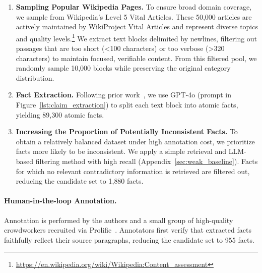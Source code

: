 \documentclass[11pt]{article}
\begin{document}
\begin{enumerate}
\item \textbf{Sampling Popular Wikipedia Pages.} To ensure broad domain coverage, we sample from Wikipedia's Level 5 Vital Articles. These 50{,}000 articles are actively maintained by WikiProject Vital Articles and represent diverse topics and quality levels.\footnote{\url{https://en.wikipedia.org/wiki/Wikipedia:Content_assessment}} We extract text blocks delimited by newlines, filtering out passages that are too short (<100 characters) or too verbose (>320 characters) to maintain focused, verifiable content. From this filtered pool, we randomly sample 10{,}000 blocks while preserving the original category distribution.

\item \textbf{Fact Extraction.} Following prior work~\citep{semnani-etal-2023-wikichat}, we use GPT-4o (prompt in Figure~\ref{lst:claim_extraction}) to split each text block into atomic facts, yielding 89{,}300 atomic facts.

\item \textbf{Increasing the Proportion of Potentially Inconsistent Facts.} To obtain a relatively balanced dataset under high annotation cost, we prioritize facts more likely to be inconsistent. We apply a simple retrieval and LLM-based filtering method with high recall (Appendix~\ref{sec:weak_baseline}). Facts for which no relevant contradictory information is retrieved are filtered out, reducing the candidate set to 1{,}880 facts.
\end{enumerate}

\paragraph{Human-in-the-loop Annotation.} Annotation is performed by the authors and a small group of high-quality crowdworkers recruited via Prolific~\citep{prolific}. Annotators first verify that extracted facts faithfully reflect their source paragraphs, reducing the candidate set to 955 facts.
\end{document}
